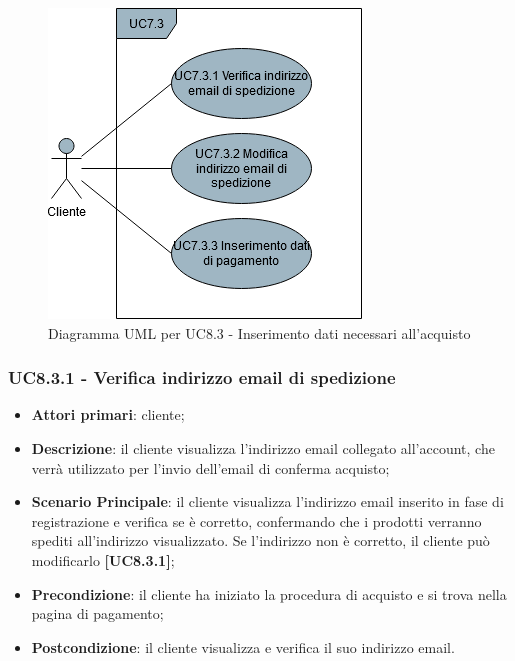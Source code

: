 \begin{figure}[H]
\centering
\includegraphics[scale=0.6]{res/UseCase/Immagini/InserimentoDatiAcquisto}
\caption{Diagramma UML per UC8.3 - Inserimento dati necessari all'acquisto}
\end{figure}

\subsubsection{UC8.3.1 - Verifica indirizzo email di spedizione}
\begin{itemize}
\item \textbf{Attori primari}: cliente;
\item \textbf{Descrizione}: il cliente visualizza l'indirizzo email collegato all'account, che verrà utilizzato per l'invio dell'email di conferma acquisto;
\item \textbf{Scenario Principale}: il cliente visualizza l'indirizzo email inserito in fase di registrazione e verifica se è corretto, confermando che i prodotti verranno spediti all'indirizzo visualizzato. Se l'indirizzo non è corretto, il cliente può modificarlo \textbf{[UC8.3.1]};
\item \textbf{Precondizione}:  il cliente ha iniziato la procedura di acquisto e si trova nella pagina di pagamento;
\item \textbf{Postcondizione}: il cliente visualizza e verifica il suo indirizzo email.
\end{itemize}

